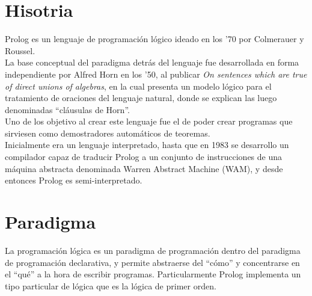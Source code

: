 \documentclass[12pt,titlepage]{report}
\begin{document}


\setcounter{page}{1}

\tableofcontents
\newpage



\clearpage	

\section{Hisotria}
Prolog es un lenguaje de programación lógico ideado en los '70 por Colmerauer y Roussel. \\

La base conceptual del paradigma detrás del lenguaje fue desarrollada en forma independiente por Alfred Horn en los '50, al publicar \textit{On sentences which are true of direct unions of algebras}, en la cual presenta un modelo lógico para el tratamiento de oraciones del lenguaje natural, donde se explican las luego denominadas ``cláusulas de Horn''. \\

Uno de los objetivo al crear este lenguaje fue el de poder crear programas que sirviesen como demostradores automáticos de teoremas. \\

Inicialmente era un lenguaje interpretado, hasta que en 1983 se desarrollo un compilador capaz de traducir Prolog a un conjunto de instrucciones de una máquina abstracta denominada Warren Abstract Machine (WAM), y desde entonces Prolog es semi-interpretado. \\

\section{Paradigma}
La programación lógica es un paradigma de programación dentro del paradigma de programación declarativa, y permite abstraerse del ``cómo'' y concentrarse en el ``qué'' a la hora de escribir programas. Particularmente Prolog implementa un tipo particular de lógica que es la lógica de primer orden. \\
\end{document}

